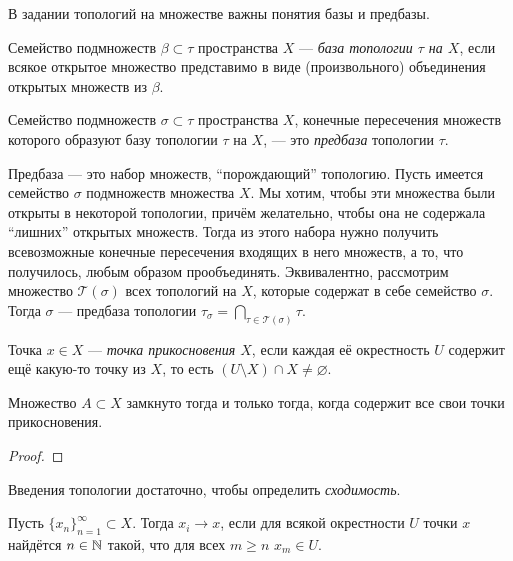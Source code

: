В задании топологий на множестве важны понятия базы и предбазы.
\begin{defin}
	Семейство подмножеств $\beta\subset\tau$ пространства $X$ --- \textit{база топологии $\tau$ на $X$}, если всякое открытое множество представимо в виде (произвольного) объединения открытых множеств из $\beta$.
\end{defin}
\begin{defin}
	Семейство подмножеств $\sigma\subset\tau$ пространства $X$, конечные пересечения множеств которого образуют базу топологии $\tau$ на $X$, --- это \textit{предбаза} топологии $\tau$.
\end{defin}
Предбаза --- это набор множеств, ``порождающий'' топологию. Пусть имеется семейство $\sigma$ подмножеств множества $X$. Мы хотим, чтобы эти множества были открыты в некоторой топологии, причём желательно, чтобы она не содержала ``лишних'' открытых множеств. Тогда из этого набора нужно получить всевозможные конечные пересечения входящих в него множеств, а то, что получилось, любым образом прообъединять. Эквивалентно, рассмотрим множество $\mathcal{T}(\sigma)$ всех топологий на $X$, которые содержат в себе семейство $\sigma$. Тогда $\sigma$ --- предбаза топологии $\tau_{\sigma}=\bigcap\limits_{\tau\in\mathcal{T}(\sigma)}\tau$.

\begin{defin}
	Точка $x\in X$ --- \textit{точка прикосновения $X$}, если каждая её окрестность $U$ содержит ещё какую-то точку из $X$, то есть $(U\setminus{X})\cap X\neq\varnothing$.
\end{defin}
\begin{prop}
	Множество $A\subset X$ замкнуто тогда и только тогда, когда содержит все свои точки прикосновения.
\end{prop}
\begin{proof}

\end{proof}
Введения топологии достаточно, чтобы определить \textit{сходимость}.
\begin{defin}
	Пусть $\{x_n\}_{n=1}^{\infty}\subset X$. Тогда $x_i\rightarrow x$, если для всякой окрестности $U$ точки $x$ найдётся $n\in\mathbb {N}$ такой, что для всех $m\geqslant n$ $x_m\in U$.
\end{defin}

